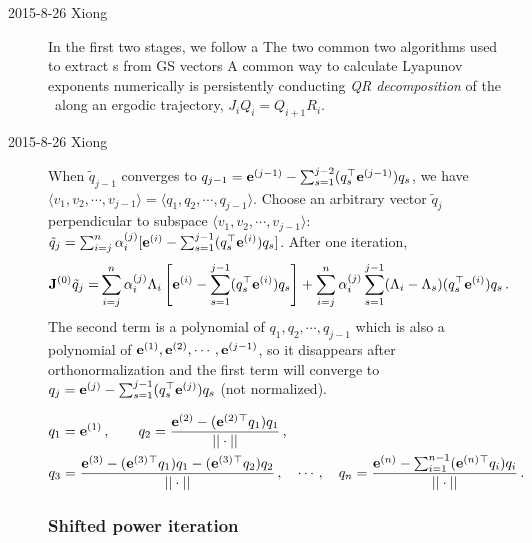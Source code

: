 \begin{description}
\item[2015-8-26 Xiong]
  In the first two stages, we follow a
  The two common two algorithms used to extract \cLv s from GS vectors
  A common way to calculate
  Lyapunov exponents numerically is persistently
  conducting \emph{QR decomposition} of the \JacobianM\
  along an ergodic trajectory, $J_iQ_i=Q_{i+1}R_i$.

\item[2015-8-26 Xiong]
  When
  $\tilde{q}_{j-1}$ converges to
  $q_{j-1}=\jEigvec[j-1]-\sum_{s=1}^{j-2}(q_{s}^\top \jEigvec[j-1])q_{s}$,
  we have
  $\langle v_{1},v_{2},\cdots,v_{j-1}\rangle=\langle
  q_{1},q_{2},\cdots,q_{j-1}\rangle$. Choose an arbitrary vector
  $\tilde{q}_{j}$ perpendicular to subspace $\langle
  v_{1},v_{2},\cdots,v_{j-1}\rangle$:
  $\tilde{q}_{j}=\sum_{i=j}^{n}\alpha_{i}^{(j)}[\jEigvec[i]-\sum_{s=1}^{j-1}
  (q^\top _{s}\jEigvec[i])q_{s}]$. After one iteration,
  \begin{align*}
    \ps{\jMps}{0}\tilde{q}_{j}
    = & \sum_{i=j}^{n}\alpha^{(j)}_{i}\ExpaEig_{i}
        \left[\jEigvec[i]-\sum_{s=1}^{j-1}(q_{s}^\top \jEigvec[i])q_{s}\right]
        + \sum_{i=j}^{n}\alpha^{(j)}_{i}\sum_{s=1}^{j-1}(\ExpaEig_{i}-\ExpaEig_{s})
        (q_{s}^\top \jEigvec[i])q_{s}
        \,.
  \end{align*}
  The second term is a polynomial of $q_{1},q_{2},\cdots,q_{j-1}$ which is
  also a polynomial of $\jEigvec[1], \jEigvec[2], \cdots, \jEigvec[j-1]$,
  so it disappears after
  orthonormalization and the first term will converge to
  $q_{j}=\jEigvec[j]-\sum_{s=1}^{j-1}(q_{s}^\top \jEigvec[j])q_{s}$ (not normalized).

  \[
    \begin{aligned}
      & q_{1} = \jEigvec[1]\,,\qquad
      q_{2} = \frac{\jEigvec[2]-(\jEigvec[2]{}^\top q_{1})q_{1}}{||\cdot ||}\,,\\
      & q_{3} = \frac{\jEigvec[3]-(\jEigvec[3]{}^\top q_{1})q_{1}-
        (\jEigvec[3]{}^\top q_{2})q_{2}}{||\cdot ||}\,,\quad \cdots\,,\quad
      q_{n} = \frac{\jEigvec[n]-\sum_{i=1}^{n-1}(\jEigvec[n]{}^\top
        q_{i})q_{i}}{||\cdot ||}
      \,.
    \end{aligned}
  \]

  \subsubsection{Shifted power iteration}


\end{description}
